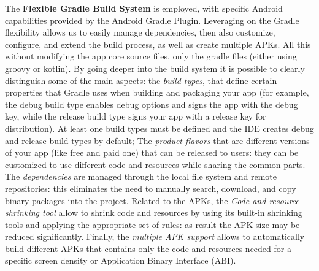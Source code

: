 \noindent The \textbf{Flexible Gradle Build System} is employed, with specific Android capabilities provided by the Android Gradle Plugin. Leveraging on the Gradle flexibility allows us to easily manage dependencies, then also customize, configure, and extend the build process, as well as create multiple APKs. All this without modifying the app core source files, only the gradle files (either using groovy or kotlin). By going deeper into the build system it is possible to clearly distinguish some of the main aspects: the \textit{build types}, that define certain properties that Gradle uses when building and packaging your app (for example, the debug build type enables debug options and signs the app with the debug key, while the release build type signs your app with a release key for distribution). At least one build types must be defined and the IDE creates debug and release build types by default; The \textit{product flavors} that are different versions of your app (like free and paid one) that can be released to users: they can be customized to use different code and resources while sharing the common parts. The \textit{dependencies} are managed through the local file system and remote repositories: this eliminates the need to manually search, download, and copy binary packages into the project. Related to the APKs, the \textit{Code and resource shrinking tool} allow to  shrink code and resources by using its built-in shrinking tools and applying the appropriate set of rules: as result the APK size may be reduced significantly. Finally, the \textit{multiple APK support} allows to automatically build different APKs that contains only the code and resources needed for a specific screen density or Application Binary Interface (ABI)\cite{AndroidStudioBuildSystemFeature}.

